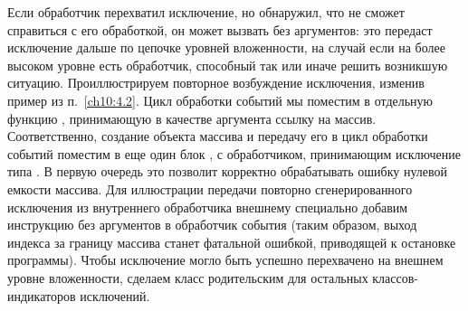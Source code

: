 Если обработчик перехватил исключение, но обнаружил, что не сможет справиться с его обработкой, он может вызвать
 без аргументов: это передаст исключение дальше по цепочке уровней вложенности, на случай
если на более высоком уровне есть обработчик, способный так или иначе решить возникшую ситуацию. Проиллюстрируем
повторное возбуждение исключения, изменив пример из п.~\ref{ch10:4.2}. Цикл обработки событий мы поместим в отдельную функцию
, принимающую в качестве аргумента ссылку на массив. Соответственно, создание объекта
массива и передачу его в цикл обработки событий поместим в еще один блок , с обработчиком,
принимающим исключение типа .  В первую очередь это позволит корректно обрабатывать
ошибку нулевой емкости массива. Для иллюстрации передачи повторно сгенерированного исключения из внутреннего
обработчика внешнему специально добавим инструкцию  без аргументов в обработчик события 
 (таким образом, выход индекса за границу массива станет фатальной ошибкой,
приводящей к остановке программы). Чтобы исключение могло быть успешно перехвачено на внешнем уровне вложенности,
сделаем класс  родительским для остальных классов-индикаторов исключений.

